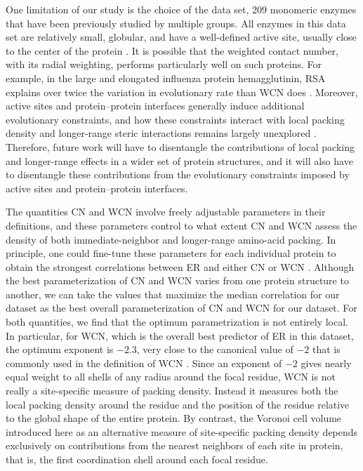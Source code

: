\documentclass[12pt]{article}
\begin{document}
One limitation of our study is the choice of the data set, 209 monomeric enzymes that have been previously studied by multiple groups. All enzymes in this data set are relatively small, globular, and have a well-defined active site, usually close to the center of the protein \cite{shih_evolutionary_2012}. It is possible that the weighted contact number, with its radial weighting, performs particularly well on such proteins. For example, in the large and elongated influenza protein hemagglutinin, RSA explains over twice the variation in evolutionary rate than WCN does  \cite{meyer_geometric_2015}. Moreover, active sites and protein--protein interfaces generally induce additional evolutionary constraints, and how these constraints interact with local packing density and longer-range steric interactions remains largely unexplored \cite{Deanetal2002, franzosa_structural_2009, meyer_geometric_2015,Abriataetal2015}. Therefore, future work will have to disentangle the contributions of local packing and longer-range effects in a wider set of protein structures, and it will also have to disentangle these contributions from the evolutionary constraints imposed by active sites and protein--protein interfaces.


   The quantities CN and WCN involve freely adjustable parameters in their definitions, and these parameters control to what extent CN and WCN assess the density of both immediate-neighbor and longer-range amino-acid packing. In principle, one could fine-tune these parameters for each individual protein to obtain the strongest correlations between ER and either CN or WCN \cite{yeh_local_2014}. Although the best parameterization of CN and WCN varies from one protein structure to another, we can take the values that maximize the median correlation for our dataset as the best overall parameterization of CN and WCN for our dataset. For both quantities, we find that the optimum parametrization is not entirely local. In particular, for WCN, which is the overall best predictor of ER in this dataset, the optimum exponent is $-2.3$, very close to the canonical value of $-2$ that is commonly used in the definition of WCN  \cite{lin_deriving_2008, yang_protein_2009, huang_mechanistic_2014, yeh_site-specific_2014, yeh_local_2014, marcos_too_2015}. Since an exponent of $-2$ gives nearly equal weight to all shells of any radius around the focal residue, WCN is not really a site-specific measure of packing density. Instead it measures both the local packing density around the residue and the position of the residue relative to the global shape of the entire protein. By contrast, the Voronoi cell volume introduced here as an alternative measure of site-specific packing density depends exclusively on contributions from the nearest neighbors of each site in protein, that is, the first coordination shell around each focal residue.
\end{document}
